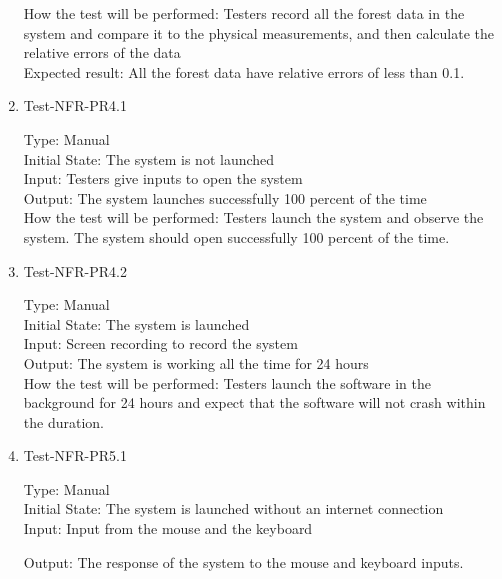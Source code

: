 \documentclass[12pt, titlepage]{article}
\begin{document}
\begin{enumerate}
How the test will be performed: Testers record all the forest data in the system and compare it to the physical measurements, and then calculate the relative errors of the data\\

Expected result: All the forest data have relative errors of less than 0.1.

\item{Test-NFR-PR4.1\\}

Type: Manual\\

Initial State: The system is not launched\\

Input: Testers give inputs to open the system\\

Output: The system launches successfully 100 percent of the time\\

How the test will be performed: Testers launch the system and observe the system. The system should open successfully 100 percent of the time.

\item{Test-NFR-PR4.2\\}

Type: Manual\\

Initial State: The system is launched\\

Input: Screen recording to record the system\\

Output: The system is working all the time for 24 hours \\

How the test will be performed: Testers launch the software in the background for 24 hours and expect that the software will not crash within the duration.

\item{Test-NFR-PR5.1\\}

Type: Manual\\

Initial State: The system is launched without an internet connection\\

Input: Input from the mouse and the keyboard

Output: The response of the system to the mouse and keyboard inputs. \\


\end{enumerate}
\end{document}
